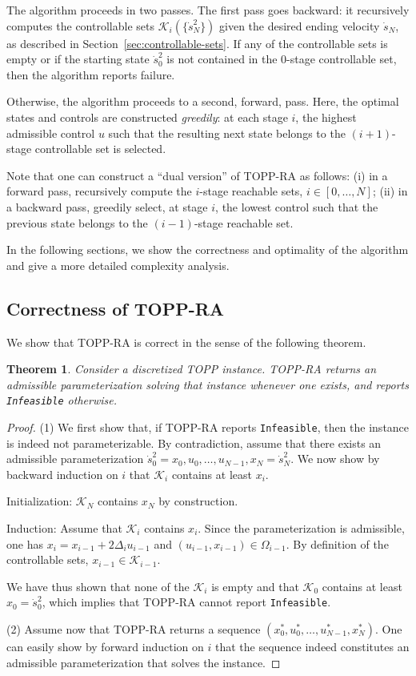 \documentclass[journal]{IEEEtran}
\theoremstyle{plain}
\newtheorem{theorem}{Theorem}
\theoremstyle{definition}
\theoremstyle{definition}
\newcommand{\calK}{\mathcal{K}}
\begin{document}
The algorithm proceeds in two passes. The first pass goes backward: it
recursively computes the controllable sets $\calK_i(\{\dot s_N^2\})$
given the desired ending velocity $\dot s_N$, as described in
Section~\ref{sec:controllable-sets}. If any of the controllable sets
is empty or if the starting state $\dot s_0^{2}$ is not contained in
the 0-stage controllable set, then the algorithm reports failure. 

Otherwise, the algorithm proceeds to a second, forward, pass. Here,
the optimal states and controls are constructed \emph{greedily}: at
each stage $i$, the highest admissible control $u$ such that the
resulting next state belongs to the $(i+1)$-stage controllable set is
selected.

Note that one can construct a ``dual version'' of TOPP-RA as
follows: (i) in a forward pass, recursively compute the $i$-stage
reachable sets, $i\in[0,\dots,N]$; (ii) in a backward pass, greedily
select, at stage $i$, the lowest control such that the 
previous state belongs to the $(i-1)$-stage reachable set. 

In the following sections, we show the correctness and optimality of
the algorithm and give a more detailed complexity analysis.


\subsection{Correctness of TOPP-RA}
\label{sec:feasibility-topp-ra}

We show that TOPP-RA is correct in the sense of the following
theorem. 

\begin{theorem}
  Consider a discretized TOPP instance. TOPP-RA returns an admissible
  parameterization solving that instance whenever one exists, and
  reports \rm{\texttt{Infeasible}} otherwise.
\end{theorem}

\begin{proof}
  (1) We first show that, if TOPP-RA reports \texttt{Infeasible}, then
  the instance is indeed not parameterizable. By contradiction, assume
  that there exists an admissible parameterization $\dot s_0^2 = x_0,
  u_0, \dots, u_{N-1}, x_N = \dot s_N^2$. We now show by backward
  induction on $i$ that $\calK_i$ contains at least $x_i$.

  \textrm{Initialization}: $\calK_N$ contains $x_N$ by construction.

  \textrm{Induction}: Assume that $\calK_i$ contains $x_i$. Since the
  parameterization is admissible, one has $x_i=x_{i-1}+2\Delta_iu_{i-1}$
  and $(u_{i-1},x_{i-1})\in\Omega_{i-1}$. By definition of the
  controllable sets, $x_{i-1}\in\calK_{i-1}$.

  We have thus shown that none of the $\calK_i$ is empty and that
  $\calK_0$ contains at least $x_0 = \dot s_0^2$, which implies that
  TOPP-RA cannot report \texttt{Infeasible}.

  (2) Assume now that TOPP-RA returns a sequence
  $(x_0^*, u_0^*, \dots, u_{N-1}^*, x_N^*)$. One can easily show by
  forward induction on $i$ that the sequence indeed constitutes an
  admissible parameterization that solves the instance.
\end{proof}
\end{document}
